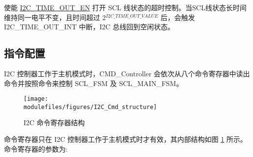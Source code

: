 \documentclass[main\_\_CN.tex]{subfiles}
\begin{document}
使能 \hyperref[fielddesc:I2CTIMEOUTEN]{I2C\_TIME\_OUT\_EN} 打开 SCL 线状态的超时控制。当SCL线状态长时间维持同一电平不变，且时间超过 2$^{\hyperref[fielddesc:I2CTIMEOUTVALUE]{I2C\_TIME\_OUT\_VALUE}}$ 后，会触发 I2C\_TIME\_OUT\_INT 中断，I2C 总线回到空闲状态。

\subsection{指令配置}\label{sec:i2c-func-descr-cmd-controller}
I2C 控制器工作于主机模式时，CMD\_Controller 会依次从八个命令寄存器中读出命令并按照命令来控制 SCL\_FSM 及 SCL\_MAIN\_FSM。

\begin{figure}[H]
    \centering
    \texttt{[image: \\modulefiles/figures/I2C\_Cmd\_structure]}
    \caption{I2C 命令寄存器结构}
    \label{fig:i2c-cmd-structure}
\end{figure}

命令寄存器只在 I2C 控制器工作于主机模式时才有效，其内部结构如图 \ref{fig:i2c-cmd-structure} 所示。命令寄存器的参数为:
\end{document}
